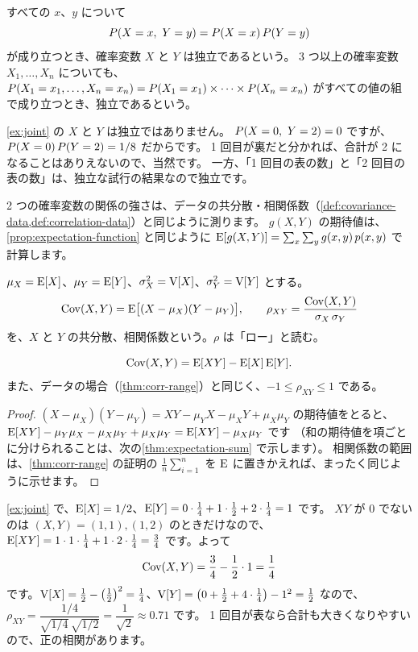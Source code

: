 \begin{definition}
  すべての $x$、$y$ について
  \[
    P(X = x,\ Y = y) = P(X = x)\, P(Y = y)
  \]
  が成り立つとき、確率変数 $X$ と $Y$ は独立であるという。
  3 つ以上の確率変数 $X_1, \dots, X_n$ についても、
  $P(X_1 = x_1, \dots, X_n = x_n) = P(X_1 = x_1) \times \dots \times P(X_n = x_n)$ がすべての値の組で成り立つとき、独立であるという。
\end{definition}

\cref{ex:joint} の $X$ と $Y$ は独立ではありません。
$P(X = 0,\ Y = 2) = 0$ ですが、$P(X = 0)\,P(Y = 2) = 1/8$ だからです。
1 回目が裏だと分かれば、合計が 2 になることはありえないので、当然です。
一方、「1 回目の表の数」と「2 回目の表の数」は、独立な試行の結果なので独立です。

2 つの確率変数の関係の強さは、データの共分散・相関係数（\cref{def:covariance-data,def:correlation-data}）と同じように測ります。
$g(X, Y)$ の期待値は、\cref{prop:expectation-function} と同じように $\mathrm{E}[g(X, Y)] = \sum_x \sum_y g(x, y)\, p(x, y)$ で計算します。

\begin{definition}
  $\mu_X = \mathrm{E}[X]$、$\mu_Y = \mathrm{E}[Y]$、$\sigma_X^2 = \mathrm{V}[X]$、$\sigma_Y^2 = \mathrm{V}[Y]$ とする。
  \[
    \mathrm{Cov}(X, Y) = \mathrm{E}\bigl[(X - \mu_X)(Y - \mu_Y)\bigr], \qquad
    \rho_{XY} = \frac{\mathrm{Cov}(X, Y)}{\sigma_X\, \sigma_Y}
  \]
  を、$X$ と $Y$ の共分散、相関係数という。$\rho$ は「ロー」と読む。
\end{definition}

\begin{proposition}
  \[
    \mathrm{Cov}(X, Y) = \mathrm{E}[XY] - \mathrm{E}[X]\,\mathrm{E}[Y].
  \]
  また、データの場合（\cref{thm:corr-range}）と同じく、$-1 \le \rho_{XY} \le 1$ である。
\end{proposition}

\begin{proof}
  $(X - \mu_X)(Y - \mu_Y) = XY - \mu_Y X - \mu_X Y + \mu_X \mu_Y$ の期待値をとると、
  $\mathrm{E}[XY] - \mu_Y \mu_X - \mu_X \mu_Y + \mu_X \mu_Y = \mathrm{E}[XY] - \mu_X \mu_Y$ です
  （和の期待値を項ごとに分けられることは、次の\cref{thm:expectation-sum} で示します）。
  相関係数の範囲は、\cref{thm:corr-range} の証明の $\frac{1}{n}\sum_{i=1}^{n}$ を $\mathrm{E}$ に置きかえれば、まったく同じように示せます。
\end{proof}

\begin{example}[共分散と相関係数の計算][ex:covariance-rv]
  \cref{ex:joint} で、$\mathrm{E}[X] = 1/2$、$\mathrm{E}[Y] = 0 \cdot \frac14 + 1 \cdot \frac12 + 2 \cdot \frac14 = 1$ です。
  $XY$ が $0$ でないのは $(X, Y) = (1, 1), (1, 2)$ のときだけなので、
  $\mathrm{E}[XY] = 1 \cdot 1 \cdot \frac14 + 1 \cdot 2 \cdot \frac14 = \frac34$ です。よって
  \[
    \mathrm{Cov}(X, Y) = \frac34 - \frac12 \cdot 1 = \frac14
  \]
  です。$\mathrm{V}[X] = \frac12 - \left(\frac12\right)^2 = \frac14$、$\mathrm{V}[Y] = \left(0 + \frac12 + 4 \cdot \frac14\right) - 1^2 = \frac12$ なので、
  $\rho_{XY} = \dfrac{1/4}{\sqrt{1/4}\,\sqrt{1/2}} = \dfrac{1}{\sqrt{2}} \approx 0.71$ です。
  1 回目が表なら合計も大きくなりやすいので、正の相関があります。
\end{example}

